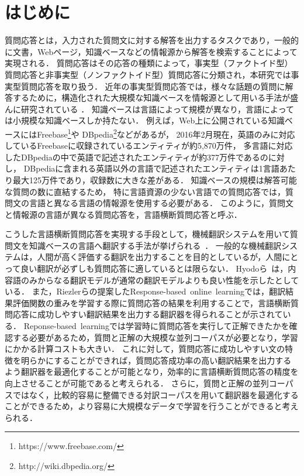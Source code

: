 \documentclass[japanese]{jnlp_1.4}
\begin{document}
\maketitle


\vspace{0.5\Cvs}
\section{はじめに}

質問応答とは，入力された質問文に対する解答を出力するタスクであり，一般的に文書，Webページ，知識ベースなどの情報源から解答を検索することによって実現される．
質問応答はその応答の種類によって，事実型（ファクトイド型）質問応答と非事実型（ノンファクトイド型）質問応答に分類され，本研究では事実型質問応答を取り扱う．
近年の事実型質問応答では，様々な話題の質問に解答するために，構造化された大規模な知識ベースを情報源として用いる手法が盛んに研究されている
\cite{kiyota2002,tunstall2010,fader2014}．
知識ベースは言語によって規模が異なり，言語によっては小規模な知識ベースしか持たない．
例えば，Web上に公開されている知識ベースにはFreebase\footnote{https://www.freebase.com/}や
DBpedia\footnote{http://wiki.dbpedia.org/}などがあるが，
2016年2月現在，英語のみに対応しているFreebaseに収録されているエンティティが約5,870万件，
多言語に対応したDBpediaの中で英語で記述されたエンティティが約377万件であるのに対し，
DBpediaに含まれる英語以外の言語で記述されたエンティティは1言語あたり最大125万件であり，収録数に大きな差がある．
知識ベースの規模は解答可能な質問の数に直結するため，	特に言語資源の少ない言語での質問応答では，質問文の言語と異なる言語の情報源を使用する必要がある．
このように，質問文と情報源の言語が異なる質問応答を，言語横断質問応答と呼ぶ．

こうした言語横断質問応答を実現する手段として，機械翻訳システムを用いて質問文を知識ベースの言語へ翻訳する手法が挙げられる~\cite{shimizu2005,mori2005}．
一般的な機械翻訳システムは，人間が高く評価する翻訳を出力することを目的としているが，人間にとって良い翻訳が必ずしも質問応答に適しているとは限らない．
Hyodoら~\cite{hyodo2009}は，内容語のみからなる翻訳モデルが通常の翻訳モデルよりも良い性能を示したとしている．
また，Riezlerらの提案したResponse-based~online~learningでは，翻訳結果評価関数の重みを学習する際に質問応答の結果を利用することで，言語横断質問応答に成功しやすい翻訳結果を出力する翻訳器を得られることが示されている\cite{riezler2014,haas2015}．
{Reponse-based~learningでは学習時に質問応答を実行して正解できたかを確認する必要があるため，質問と正解の大規模な並列コーパスが必要となり，学習にかかる計算コストも大きい．
これに対して，質問応答に成功しやすい文の特徴を明らかにすることができれば，質問応答成功率の高い翻訳結果を出力するよう翻訳器を最適化することが可能となり，効率的に言語横断質問応答の精度を向上させることが可能であると考えられる．
さらに，質問と正解の並列コーパスではなく，比較的容易に整備できる対訳コーパスを用いて翻訳器を最適化することができるため，より容易に大規模なデータで学習を行うことができると考えられる．}
\end{document}
